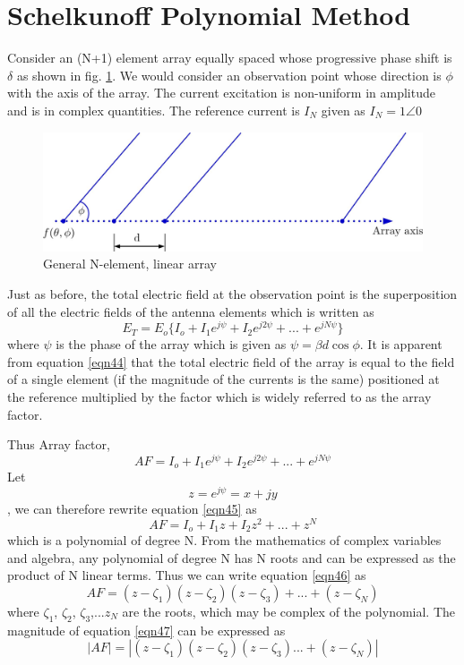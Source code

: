 \section{Schelkunoff Polynomial Method}
Consider an (N+1) element array equally spaced whose progressive phase shift is $\delta$ as shown in fig. \ref{fig:fig 55_1}. We would consider an observation point whose direction is $\phi$ with the axis of the array. The current excitation is non-uniform in amplitude and is in complex quantities. The reference current is $I_{N}$ given as $I_{N}=1\angle 0$
\begin{figure}[h]
\centering
\includegraphics[width=1\linewidth]{"./graphics/image58_1"}
\caption{ General N-element, linear array}
\label{fig:fig 55_1}
\end{figure}

Just as before, the total electric field at the observation point is the superposition of all the electric fields of the antenna elements which is written as 
\begin{equation}
E_{T}=E_{o}\{I_{o}+I_{1}e^{j\psi}+I_{2}e^{j2\psi}+...+e^{jN\psi}\}
\label{eqn44}
\end{equation}
where $\psi$ is the phase of the array which is given as $\psi=\beta d\cos\phi$. It is apparent from equation \ref{eqn44} that the total electric field of the array is equal to the field of a single element (if the magnitude of the currents is the same) positioned at the reference multiplied by the factor which is widely referred to as the array factor. 

Thus Array factor,
\begin{equation}
AF=I_{o}+I_{1}e^{j\psi}+I_{2}e^{j2\psi}+...+e^{jN\psi}
\label{eqn45}
\end{equation}
 Let $$z=e^{j\psi}=x+jy$$, we can therefore rewrite equation \ref{eqn45} as
\begin{equation}
AF=I_{o}+I_{1}z+I_{2}z^{2}+...+z^N
\label{eqn46}
\end{equation}
which is a polynomial of degree N. From the mathematics of complex variables and algebra, any polynomial of degree N has N roots and can be expressed as the product of N linear terms. Thus we can write equation \ref{eqn46} as 
\begin{equation}
AF=(z-\zeta_1)(z-\zeta_2)(z-\zeta_3)+...+(z-\zeta_N)
\label{eqn47}
\end{equation}
where $\zeta_{1}$, $\zeta_{2}$, $\zeta_{3}$,...$z_{N}$ are the roots, which may be complex of the polynomial. The magnitude of equation \ref{eqn47} can be expressed as
\begin{equation}
|AF|=|(z-\zeta_1)(z-\zeta_2)(z-\zeta_3)...+(z-\zeta_N)|
\label{eqn48}
\end{equation}

